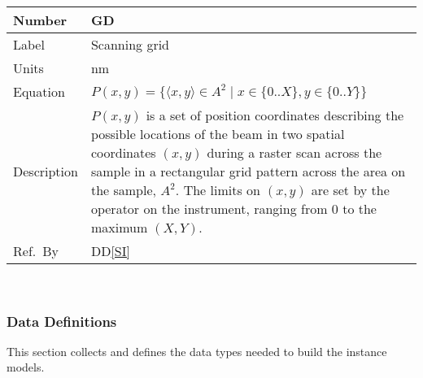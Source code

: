 \documentclass[12pt]{article}
\newcommand{\colAwidth}{0.13\textwidth}
\newcommand{\colBwidth}{0.82\textwidth}
\newcounter{defnum} %
\newcommand{\ddref}[1]{DD\ref{#1}}
\begin{document}
\noindent
\begin{minipage}{\textwidth}
	\renewcommand*{\arraystretch}{1.5}
	\begin{tabular}{| p{\colAwidth} | p{\colBwidth}|}
		\hline
		\rowcolor[gray]{0.9}
		Number& GD{defnum}\thedefnum \label{grid}\\
		\hline
		Label & Scanning grid  \\
		\hline
		Units& \si{\nano\metre}\\
		\hline
		Equation& $P(x,y) = \{\langle x, y \rangle \in A^2 \mid x \in \{0..X\}, y \in \{0..Y\} \}$\\
		\hline
		Description & $P(x,y)$ is a set of position coordinates describing the possible locations of the beam in two spatial coordinates $(x, y)$ during a raster scan across the sample in a rectangular grid pattern across the area on the sample, $A^2$. The limits on $(x,y)$ are set by the operator on the instrument, ranging from 0 to the maximum $(X,Y)$.
		\\
		  \hline
		  Ref.\ By & \ddref{SI}\\
		  \hline
	\end{tabular}
\end{minipage}\\

\subsubsection{Data Definitions}\label{sec_datadef}

This section collects and defines the data types needed to build the instance
models.

~\newline
\end{document}
